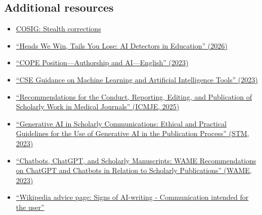 \documentclass[letterpaper, 12pt]{article}
\begin{document}
\subsection*{Additional resources}
\begin{itemize}
    \setlength\itemsep{-0.5em}

    \item \href{https://osf.io/2kdez/files/34nj5}{COSIG: Stealth corrections}
    

    \item \href{https://doi.org/10.1080/1360080X.2026.2622146}{``Heads We Win, Tails You Lose: AI Detectors in Education'' (2026)}

    \item \href{https://publicationethics.org/guidance/cope-position/authorship-and-ai-tools}{``COPE Position—Authorship and AI—English'' (2023)}

    \item \href{https://doi.org/10.36591/SE-D-4602-07}{``CSE Guidance on Machine Learning and Artificial Intelligence Tools'' (2023)}

    \item \href{https://www.icmje.org/icmje-recommendations.pdf}{``Recommendations for the Conduct, Reporting, Editing, and Publication of Scholarly Work in Medical Journals'' (ICMJE, 2025)}

    \item \href{https://stm-assoc.org/document/stm-generative-ai-paper-2023/}{``Generative AI in Scholarly Communications: Ethical and Practical Guidelines for the Use of Generative AI in the Publication Process'' (STM, 2023)}

    \item \href{https://wame.org/page3.php?id=106}{``Chatbots, ChatGPT, and Scholarly Manuscripts: WAME Recommendations on ChatGPT and Chatbots in Relation to Scholarly Publications'' (WAME, 2023)}

    \item \href{https://en.wikipedia.org/wiki/Wikipedia:Signs_of_AI_writing#Communication_intended_for_the_user}{``Wikipedia advice page: Signs of AI-writing - Communication intended for the user''}
\end{itemize}
\end{document}
